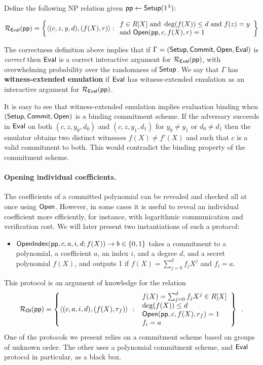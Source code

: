 \documentclass{article}
\theoremstyle{definition}
\begin{document}
Define the following NP relation given $\textsf{pp} \leftarrow \textsf{{Setup}}(1^\lambda)$: 

\[ 
\mathcal{R_\textsf{Eval}}(\textsf{pp}) = \left\{
\langle (c, z, y, d), (f(X), r) \rangle
: 
\begin{array}{l} 
f \in R[X] \ \text{and} \ \deg(f(X)) \leq d \ \text{and} \ f(z) = y \\ 
 \text{and} \ \textsf{{Open}}(\textsf{pp}, c, f(X), r) = 1 \\
\end{array}
\right\}
\] 

The correctness definition above implies that if $\Gamma = (\textsf{{Setup}}, \textsf{{Commit}}, \textsf{{Open}}, \textsf{{Eval}})$ is \emph{correct} then $\textsf{{Eval}}$ is a correct interactive argument for $\mathcal{R_\textsf{Eval}}(\textsf{pp})$, with overwhelming probability over the randomness of $\textsf{{Setup}}$. We say that $\Gamma$ has \textbf{witness-extended emulation} if $\textsf{{Eval}}$ has witness-extended emulation as an interactive argument for $\mathcal{R_\textsf{Eval}}(\textsf{pp})$. 

It is easy to see that witness-extended emulation implies evaluation binding when $(\textsf{{Setup}}, \textsf{{Commit}}, \textsf{{Open}})$ is a binding commitment scheme. If the adversary succeeds in $\textsf{{Eval}}$ on both $(c, z, y_0, d_0)$ and $(c, z, y_1, d_1)$ for $y_0 \neq y_1$ or $d_0 \neq d_1$ then the emulator obtains two distinct witnesses $f(X) \neq f'(X)$ and such that $c$ is a valid commitment to both. This would contradict the binding property of the commitment scheme. 

\paragraph{Opening individual coefficients.} The coefficients of a committed polynomial can be revealed and checked all at once using $\textsf{{Open}}$. However, in some cases it is useful to reveal an individual coefficient more efficiently, for instance, with logarithmic communication and verification cost. We will later present two instantiations of such a protocol:
\begin{itemize}
    \item $\textsf{{OpenIndex}}(\textsf{pp}, c, a, i, d; f(X)) \rightarrow b \in \{0,1\}$ takes a commitment to a polynomial, a coefficient $a$, an index $i$, and a degree $d$, and a secret polynomial $f(X)$, and outputs 1 if $f(X) = \sum_{j=0}^d f_j X^j$ and $f_i = a$.
\end{itemize}
This protocol is an argument of knowledge for the relation
\[
    \mathcal{R}_\mathsf{OI}(\textsf{pp}) = \left\{
        \langle (c, a, i, d), (f(X), r_f) \rangle \ : \ \begin{array}{l}
            f(X) = \sum_{j=0}^{d} f_j X^j \in R[X] \\
            \deg(f(X)) \leq d \\
            \textsf{{Open}}(\textsf{pp}, c, f(X), r_f) = 1 \\
            f_i = a
        \end{array}
    \right\} \enspace .
\]
One of the protocols we present relies on a commitment scheme based on groups of unknown order. The other uses a polynomial commitment scheme, and $\textsf{{Eval}}$ protocol in particular, as a black box.
\end{document}
